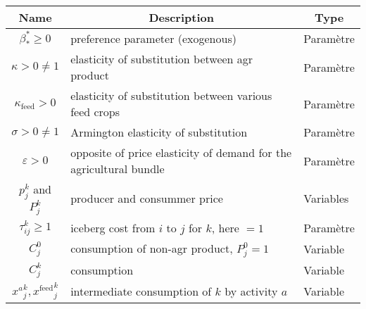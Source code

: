 \begin{table}[h!]
    \begin{tabular}{c|l|l}
        \multicolumn{1}{c}{\textbf{Name}}           & \multicolumn{1}{|c|}{\textbf{Description}}                         & \multicolumn{1}{c}{\textbf{Type}} \\
        \hline
        $\beta_*^* \ge 0$                           & preference parameter (exogenous)                                   & Paramètre                         \\

        $\kappa > 0 \neq 1$                         & elasticity of substitution between agr product                     & Paramètre                         \\

        $\kappa_{\text{feed}} > 0$                  & elasticity of substitution between various feed crops              & Paramètre                         \\

        $\sigma > 0 \neq 1$                         & Armington elasticity of substitution                               & Paramètre                         \\

        $\varepsilon > 0$                           & opposite of price elasticity of demand for the agricultural bundle & Paramètre                         \\

        $p_j^k$ and $P_j^k$                         & producer and consummer price                                       & Variables                         \\

        $\tau_{ij}^k \ge 1$                         & iceberg cost from $i$ to $j$ for $k$, here $=1$                    & Paramètre                         \\

        $C_j^0$                                     & consumption of non-agr product, $P_j^0 = 1$                        & Variable                          \\

        $C_j^k$                                     & consumption                                                        & Variable                          \\

        ${x^a}_j^k, {x^\text{feed}}_j^k$            & intermediate consumption of $k$ by activity $a$                    & Variable                          \\


\end{tabular}
\end{table}
